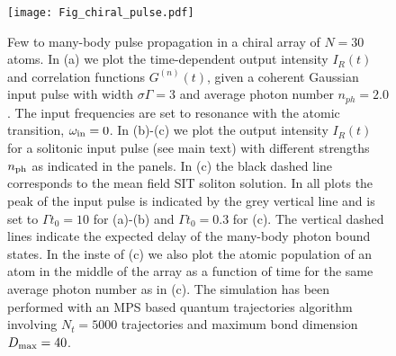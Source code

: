 \documentclass[pra,twocolumn,showpacs,preprintnumbers,amsmath,amssymb]{revtex4-1}
\begin{document}
\begin{figure}
\texttt{[image: Fig\_chiral\_pulse.pdf]}%
\caption{Few to many-body pulse propagation in a chiral  array of $N=30$ atoms. In (a) we plot the time-dependent output intensity $I_R(t)$ and correlation functions $G^{(n)}(t)$, given a coherent Gaussian input pulse with width $\sigma\Gamma=3$ and average photon number $n_{ph}=2.0$. The input frequencies are set to resonance with the atomic transition, $\omega_{\rm in}=0$.  In (b)-(c) we plot the output intensity $I_R(t)$ for a solitonic input pulse (see main text) with different strengths $ n_{\rm ph}$ as indicated in the panels.  In (c) the black dashed line corresponds to  the mean field SIT soliton solution. In all plots the peak of the input pulse is indicated by the grey vertical line and is set to $\Gamma t_0=10$ for (a)-(b) and  $\Gamma t_0=0.3$ for (c). The vertical dashed lines  indicate  the expected delay of the many-body photon bound states. In the inste of (c) we also plot the atomic population of an atom in the middle of the array  as a function of time for the same average photon number as in (c). The simulation has been performed with an MPS based quantum trajectories algorithm involving $N_t=5000$ trajectories and maximum bond dimension $D_{\rm max}=40$.}
\label{fig:pulse_chiral}
\end{figure}
\end{document}
